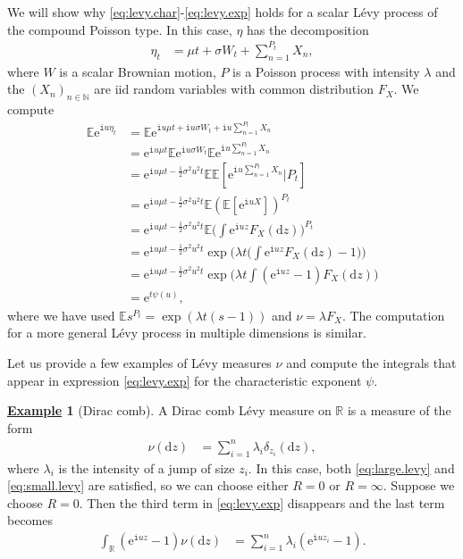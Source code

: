 \documentclass[12pt]{book}
\numberwithin{equation}{chapter}
\theoremstyle{plain}
\numberwithin{theorem}{section}
\theoremstyle{definition}
\newtheorem{example}[theorem]{\underline{Example}}
\numberwithin{exercise}{chapter}
\let\oldendproof\endproof
\renewenvironment{proof}[1][\proofname]{%
  \oldproof[\scshape\underline{#1}]%
}{\oldendproof}
\newcommand{\<}{\langle}
\renewcommand{\>}{\rangle}
\renewcommand{\(}{\left(}
\renewcommand{\)}{\right)}
\renewcommand{\[}{\left[}
\renewcommand{\]}{\right]}
\newcommand\Eb{\mathds{E}}
\newcommand\Rb{\mathds{R}}
\newcommand\Nb{\mathds{N}}
\newcommand\sig{\sigma}
\newcommand\lam{\lambda}
\newcommand\del{\delta}
\newcommand\ii{\mathtt{i}}
\newcommand\dd{\mathrm{d}}
\newcommand\ee{\mathrm{e}}
\begin{document}
\begin{proof}
We will show why \eqref{eq:levy.char}-\eqref{eq:levy.exp} holds for a scalar L\'evy process of the compound Poisson type.  In this case, $\eta$ has the decomposition
\begin{align}
\eta_t
	&=	\mu t + \sig W_t + \sum_{n = 1}^{P_t} X_n ,
\end{align}
where $W$ is a scalar Brownian motion, $P$ is a Poisson process with intensity $\lam$ and the $(X_n)_{n \in \Nb}$ are iid random variables with common distribution $F_X$.  We compute
\begin{align}
\Eb \ee^{\ii u \eta_t}
	&=	\Eb \ee^{ \ii u \mu t + \ii u \sig W_t + \ii u \sum_{n = 1}^{P_t} X_n} \\
	&=	\ee^{\ii u \mu t} \Eb \ee^{ \ii u \sig W_t } \Eb \ee^{ \ii u \sum_{n = 1}^{P_t} X_n} \\
	&=	\ee^{\ii u \mu t - \tfrac{1}{2} \sig^2 u^2 t} \Eb \Eb[ \ee^{\ii u \sum_{n = 1}^{P_t} X_n} | P_t ] \\
	&=	\ee^{\ii u \mu t - \tfrac{1}{2} \sig^2 u^2 t} \Eb ( \Eb[ \ee^{\ii u X } ] )^{P_t} \\
	&=	\ee^{\ii u \mu t - \tfrac{1}{2} \sig^2 u^2 t} \Eb \Big( \int \ee^{\ii u z} F_X(\dd z) \Big)^{P_t} \\
	&=	\ee^{\ii u \mu t - \tfrac{1}{2} \sig^2 u^2 t} \exp \Big( \lam t \big( \int \ee^{\ii u z} F_X(\dd z) - 1 \big) \Big) \\
	&=	\ee^{\ii u \mu t - \tfrac{1}{2} \sig^2 u^2 t} \exp \Big( \lam t \int ( \ee^{\ii u z} - 1 ) F_X(\dd z) \Big) \\
	&=	\ee^{t \psi(u)} ,
\end{align}
where we have used $\Eb s^{P_t} = \exp( \lam t ( s - 1 ) )$ and $\nu = \lam F_X$.
The computation for a more general L\'evy process in multiple dimensions is similar.
\end{proof}

\noindent
Let us provide a few examples of L\'evy measures $\nu$ and compute the integrals that appear in expression \eqref{eq:levy.exp} for the characteristic exponent $\psi$.

\begin{example}[Dirac comb]
A Dirac comb L\'evy measure on $\Rb$ is a measure of the form
\begin{align}
\nu( \dd z)
	&=	\sum_{i=1}^n \lam_i \del_{z_i}(\dd z) ,
\end{align}
where $\lam_i$ is the intensity of a jump of size $z_i$.  In this case, both \eqref{eq:large.levy} and \eqref{eq:small.levy} are satisfied, so we can choose either $R=0$ or $R = \infty$.  Suppose we choose $R = 0$.  Then the third term in \eqref{eq:levy.exp} disappears and the last term becomes
\begin{align}
\int_\Rb (\ee^{\ii u z} - 1 ) \nu(\dd z)
	&=	\sum_{i=1}^n \lam_i (\ee^{\ii u z_i} - 1 ) .
\end{align}
\end{example}
\end{document}
